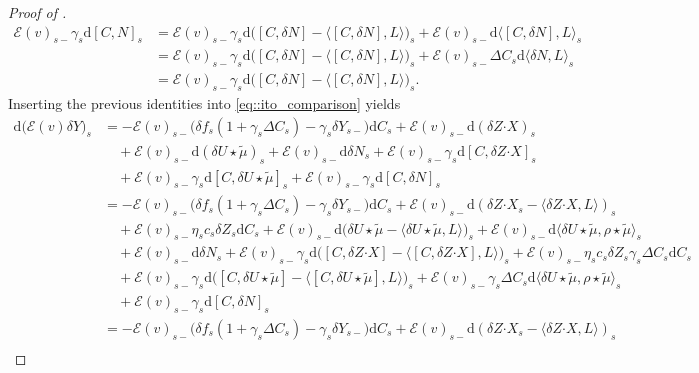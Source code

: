 \documentclass[10pt]{article} %
\newcommand\cE{\mathcal E}
\newcommand{\bcdot}{\boldsymbol{\cdot}}
\newcommand{\1}{\mathbf{1}}
\def\d{\mathrm{d}}
\begin{document}
\begin{proof}[Proof of ]
\begin{align*}
		\cE(v)_{s-}\gamma_s \d [C,N]_s 
		&= \cE(v)_{s-}\gamma_s \d \big([C,\delta N] - \big\langle [C,\delta N],L\big\rangle \big)_s + \cE(v)_{s-}\d\big\langle [C,\delta N],L\big\rangle_s \\
		&= \cE(v)_{s-}\gamma_s \d \big([C,\delta N] - \big\langle [C,\delta N],L\big\rangle \big)_s + \cE(v)_{s-}\Delta C_s\d\big\langle \delta N,L\big\rangle_s \\
		&= \cE(v)_{s-}\gamma_s \d \big([C,\delta N] - \big\langle [C,\delta N],L\big\rangle \big)_s.
	\end{align*}
	Inserting the previous identities into \eqref{eq::ito_comparison} yields
	\begin{align}\label{eq::ito_comparison2}
		\d \big(\cE(v)\delta Y\big)_s 
		&= - \cE(v)_{s-} \big(\delta f_s(1+\gamma_s\Delta C_s) - \gamma_s\delta Y_{s-}\big)\d C_s + \cE(v)_{s-} \d(\delta Z \bcdot X)_s \nonumber\\
		&\quad + \cE(v)_{s-}\d (\delta U \star\tilde\mu)_s + \cE(v)_{s-}\d \delta N_s +\cE(v)_{s-}\gamma_s \d [C,\delta Z \bcdot X]_s \nonumber\\
		&\quad + \cE(v)_{s-}\gamma_s \d [C,\delta U \star\tilde\mu]_s + \cE(v)_{s-}\gamma_s \d [C,\delta N]_s \nonumber\\
		&= - \cE(v)_{s-} \big(\delta f_s(1+\gamma_s\Delta C_s) - \gamma_s\delta Y_{s-}\big)\d C_s + \cE(v)_{s-}\d (\delta Z \bcdot X_s - \langle \delta Z \bcdot X,L \rangle)_s \nonumber\\
		&\quad + \cE(v)_{s-} \eta_s c_s\delta Z_s \d C_s + \cE(v)_{s-}\d\big(\delta U \star \tilde\mu - \langle \delta U \star\tilde\mu,L\rangle\big)_s + \cE(v)_{s-}\d \langle \delta U \star\tilde\mu,\rho\star\tilde\mu\rangle_s \nonumber\\
		&\quad + \cE(v)_{s-}\d \delta N_s + \cE(v)_{s-}\gamma_s \d\big([C,\delta Z \bcdot X]-\big\langle [C,\delta Z \bcdot X],L \big\rangle\big)_s + \cE(v)_{s-}\eta_s c_s \delta Z_s \gamma_s \Delta C_s \d C_s \nonumber\\
		&\quad + \cE(v)_{s-}\gamma_s \d\big([C,\delta U \star\tilde\mu]-\big\langle [C,\delta U \star\tilde\mu],L \big\rangle\big)_s + \cE(v)_{s-}\gamma_s \Delta C_s \d\langle \delta U \star\tilde\mu,\rho\star\tilde\mu \rangle_s \nonumber\\
		&\quad + \cE(v)_{s-}\gamma_s \d [C,\delta N]_s \nonumber\\
		&= -  \cE(v)_{s-} \big(\delta f_s(1+\gamma_s\Delta C_s) - \gamma_s\delta Y_{s-}\big)\d C_s + \cE(v)_{s-}\d (\delta Z \bcdot X_s - \langle \delta Z \bcdot X,L \rangle)_s \nonumber\\

\end{align}
\end{proof}
\end{document}
